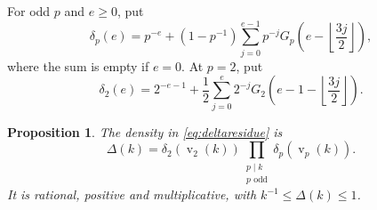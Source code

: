 \documentclass[11pt,a4paper]{article}
\numberwithin{equation}{section}
\newtheorem{proposition}[theorem]{Proposition}
\theoremstyle{remark}
\newcommand{\vp}{\operatorname{v}}
\begin{document}
For odd $p$ and $e\ge0$, put
\begin{equation}\label{eq:oddlocal}
\delta_p(e)=p^{-e}+(1-p^{-1})\sum_{j=0}^{e-1}p^{-j}
G_p\!\left(e-\left\lfloor\frac{3j}{2}\right\rfloor\right),
\end{equation}
where the sum is empty if $e=0$. At $p=2$, put
\begin{equation}\label{eq:twolocal}
\delta_2(e)=2^{-e-1}+\frac12\sum_{j=0}^{e}2^{-j}
G_2\!\left(e-1-\left\lfloor\frac{3j}{2}\right\rfloor\right).
\end{equation}
\begin{proposition}\label{prop:local}
The density in \eqref{eq:deltaresidue} is
\begin{equation}\label{eq:product}
\Delta(k)=\delta_2(\vp_2(k))\prod_{\substack{p\mid k\\p\text{ odd}}}\delta_p(\vp_p(k)).
\end{equation}
It is rational, positive and multiplicative, with $k^{-1}\le\Delta(k)\le1$.
\end{proposition}
\end{document}
